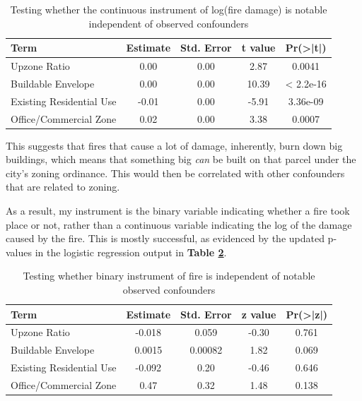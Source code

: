 \documentclass[a4paper,12pt]{article}
\begin{document}
\begin{table}[hbt]
    \caption{Testing whether the continuous instrument of log(fire damage) is notable independent of observed confounders}
    \label{table:fire.o.c.regression_output}
    \setlength{\tabcolsep}{10pt} 
    \centering
    \begin{tabular}{lcccc}
        \hline
        Term & Estimate & Std. Error & t value & Pr(>|t|) \\
        \hline
        Upzone Ratio & 0.00 & 0.00 & 2.87 & 0.0041 \\
        Buildable Envelope & 0.00 & 0.00 & 10.39 & < 2.2e-16 \\
        Existing Residential Use & -0.01 & 0.00 & -5.91 & 3.36e-09 \\
        Office/Commercial Zone & 0.02 & 0.00 & 3.38 & 0.0007 \\
        \hline
    \end{tabular}
\end{table}


This suggests that fires that cause a lot of damage, inherently, burn down big buildings, which means that something big \textit{can} be built on that parcel under the city's zoning ordinance. This would then be correlated with other confounders that are related to zoning.

As a result, my instrument is the binary variable indicating whether a fire took place or not, rather than a continuous variable indicating the log of the damage caused by the fire. This is mostly successful, as evidenced by the updated p-values in the logistic regression output in \textbf{Table \ref{table:fire.binom.o.c.regression_output}}.

\begin{table}[hbt]

    \caption{Testing whether binary instrument of fire is independent of notable observed confounders}
    \setlength{\tabcolsep}{10pt} 
    \label{table:fire.binom.o.c.regression_output}
       \centering 
    \begin{tabular}{lcccc}
        \hline
        Term & Estimate & Std. Error & z value & Pr(>|z|) \\
        \hline
        Upzone Ratio & -0.018 & 0.059 & -0.30 & 0.761 \\
        Buildable Envelope & 0.0015 & 0.00082 & 1.82 & 0.069 \\
        Existing Residential Use & -0.092 & 0.20 & -0.46 & 0.646 \\
        Office/Commercial Zone & 0.47 & 0.32 & 1.48 & 0.138 \\
        \hline
    \end{tabular}
\end{table}
\end{document}
